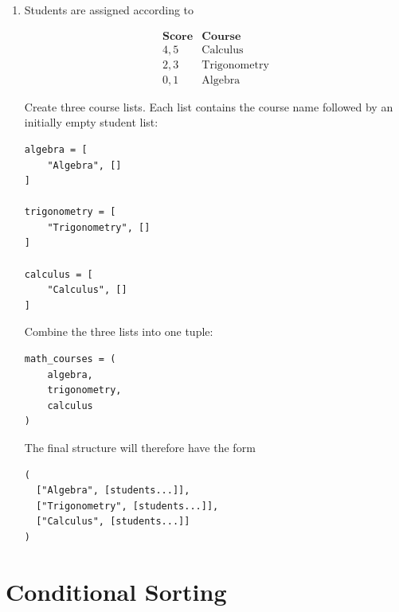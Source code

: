 \documentclass{article}
\begin{document}
\begin{enumerate}

\item Students are assigned according to

\[
\begin{array}{c|c}
\textbf{Score} & \textbf{Course} \\ \hline
4,5 & \text{Calculus} \\
2,3 & \text{Trigonometry} \\
0,1 & \text{Algebra}
\end{array}
\]

Create three course lists.  Each list contains the course
name followed by an initially empty student list:

\begin{verbatim}
algebra = [
    "Algebra", []
]

trigonometry = [
    "Trigonometry", []
]

calculus = [
    "Calculus", []
]
\end{verbatim}

Combine the three lists into one tuple:

\begin{verbatim}
math_courses = (
    algebra,
    trigonometry,
    calculus
)
\end{verbatim}

The final structure will therefore have the form

\begin{verbatim}
(
  ["Algebra", [students...]],
  ["Trigonometry", [students...]],
  ["Calculus", [students...]]
)
\end{verbatim}

\end{enumerate}


\section{Conditional Sorting}
\end{document}
